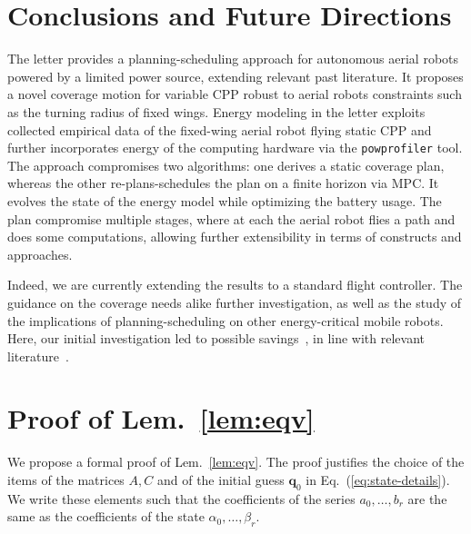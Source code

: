 \documentclass[letterpaper,10pt,journal,twoside]{IEEEtran}
\newcommand{\stt}[1]{{\small\tt #1}} %
\newcommand{\powprof}{\stt{powprofiler}}
\theoremstyle{definition}
\begin{document}
\section{Conclusions and Future Directions}  %
\label{sec:conclusion}                       %
The letter provides a planning-scheduling approach for autonomous aerial robots powered by a limited power source, extending relevant past literature. It proposes a novel coverage motion for variable CPP robust to aerial robots constraints such as the turning radius of fixed wings. Energy modeling in the letter exploits collected empirical data of the fixed-wing aerial robot flying static CPP and further incorporates energy of the computing hardware via the \powprof{} tool. The approach compromises two algorithms: one derives a static coverage plan, whereas the other re-plans-schedules the plan on a finite horizon via MPC. It evolves the state of the energy model while optimizing the battery usage. The plan compromise multiple stages, where at each the aerial robot flies a path and does some computations, allowing further extensibility in terms of constructs and approaches.

Indeed, we are currently extending the results to a standard flight controller. The guidance on the coverage needs alike further investigation, as well as the study of the implications of planning-scheduling on other energy-critical mobile robots. Here, our initial investigation led to possible savings~\cite{seewald2020beyond}, in line with relevant literature~\cite{ondruska2015scheduled,lahijanian2018resource}.


{\small  %
}             %

\appendices

\section{Proof of Lem.~\ref{lem:eqv}}
\label{app:proof-eqv}

We propose a formal proof of Lem.~\ref{lem:eqv}. The proof justifies the choice of the items of the matrices $A,C$ and of the initial guess $\mathbf{q}_0$ in Eq.~(\ref{eq:state-details}). We write these elements such that the coefficients of the series $a_0,\dots,b_r$ are the same as the coefficients of the state $\alpha_0,\dots,\beta_r$.
\end{document}
